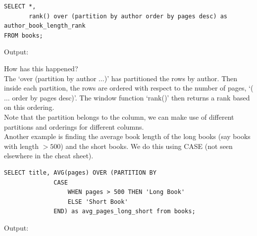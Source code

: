 \documentclass[8pt]{extarticle}
\begin{document}
\begin{multicols}{4}
\vspace{0.5ex}
\begin{lstlisting}[style=sql]
SELECT *,
       rank() over (partition by author order by pages desc) as author_book_length_rank
FROM books;
\end{lstlisting}
\vspace{0.5ex}

Output:

\begin{center}
\end{center}

How has this happened?\\
The `over (partition by author $\ldots$)' has partitioned the rows by author. Then inside each partition, the rows are ordered with respect to the number of pages, `($\ldots$ order by pages desc)'. The window function `rank()' then returns a rank based on this ordering.\\

Note that the partition belongs to the column, we can make use of different partitions and orderings for different columns.\\

Another example is finding the average book length of the long books (say books with length $> 500$) and the short books. We do this using CASE (not seen elsewhere in the cheat sheet).

\vspace{0.5ex}
\begin{lstlisting}[style=sql]
SELECT title, AVG(pages) OVER (PARTITION BY 
              CASE
                  WHEN pages > 500 THEN 'Long Book'
                  ELSE 'Short Book'
              END) as avg_pages_long_short from books;
\end{lstlisting}

Output:
\vspace{-1.5ex}
\begin{center}
\end{center}


\end{multicols}
\end{document}
